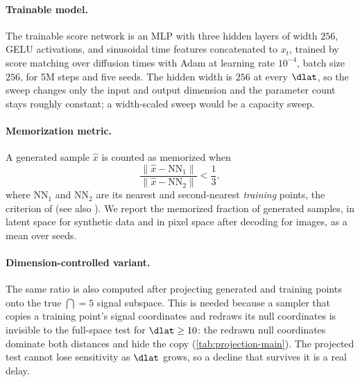 \paragraph{Trainable model.}
The trainable score network is an MLP with three hidden layers of width $256$, GELU activations, and sinusoidal time features concatenated to $x_t$, trained by score matching over diffusion times with Adam at learning rate $10^{-4}$, batch size $256$, for 5M steps and five seeds. The hidden width is $256$ at every $\dlat$, so the sweep changes only the input and output dimension and the parameter count stays roughly constant; a width-scaled sweep would be a capacity sweep.

\paragraph{Memorization metric.}
A generated sample $\hat x$ is counted as memorized when
\begin{equation*}
  \frac{\|\hat x-\mathrm{NN}_1\|}{\|\hat x-\mathrm{NN}_2\|}<\frac{1}{3},
\end{equation*}
where $\mathrm{NN}_1$ and $\mathrm{NN}_2$ are its nearest and second-nearest \emph{training} points, the criterion of \citet{bonnaire2025} (see also \citealp{somepalli2023diffusion}). We report the memorized fraction of generated samples, in latent space for synthetic data and in pixel space after decoding for images, as a mean over seeds.

\paragraph{Dimension-controlled variant.}
The same ratio is also computed after projecting generated and training points onto the true $\dint=5$ signal subspace. This is needed because a sampler that copies a training point's signal coordinates and redraws its null coordinates is invisible to the full-space test for $\dlat\ge10$: the redrawn null coordinates dominate both distances and hide the copy (\cref{tab:projection-main}). The projected test cannot lose sensitivity as $\dlat$ grows, so a decline that survives it is a real delay.
